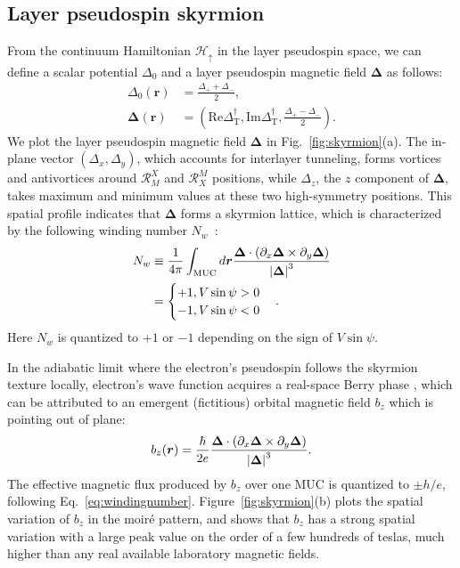 \documentclass[aps,prx,floatfix,twocolumn]{revtex4-1}
\begin{document}
	\subsection{Layer pseudospin skyrmion}
	From the continuum Hamiltonian $\mathcal{H}_{\uparrow}$ in the layer pseudospin space, we can define a scalar potential $\Delta_0$ and a layer pseudospin magnetic field $\bm{\Delta}$ as follows:
	\begin{equation} \label{key}
	\begin{aligned}
	\Delta_0(\bm{r})&=\frac{\Delta_+ + \Delta_-}{2},\\
	\bm{\Delta}(\bm{r})&=\left(\text{Re}\Delta_{\text{T}}^\dagger,\text{Im}\Delta_{\text{T}}^\dagger, \frac{\Delta_+ - \Delta_-}{2} \right).
	\end{aligned}
	\end{equation}
	We plot the layer pseudospin magnetic field $\bm{\Delta}$ in Fig.~\ref{fig:skyrmion}(a). The in-plane vector $(\Delta_x, \Delta_y)$,  which accounts for interlayer tunneling, forms vortices and antivortices  around $\mathcal{R}_{M}^X$ and $\mathcal{R}_{X}^M$ positions, while $\Delta_z$, the $z$ component of $\bm{\Delta}$, takes maximum and minimum values at these two high-symmetry positions.  This spatial profile indicates that $\bm{\Delta}$ forms a skyrmion lattice, which is characterized by the following winding number $N_w$~\cite{nagaosa2013topological}:
	\begin{equation}\label{eq:windingnumber}
	\begin{aligned}
	N_w &\equiv\frac{1}{4\pi}\int_{\text{MUC}}d\bm{r}\frac{\bm{\Delta}\cdot(\partial_x \bm{\Delta} \times \partial_y \bm{\Delta})}{\abs{\bm{\Delta}}^3}\\
	&=\begin{cases}
	+1, V\sin\psi>0\\
	-1, V\sin\psi<0
	\end{cases}.
	\end{aligned}
	\end{equation}
	Here $N_w$ is quantized to $+1$ or $-1$ depending on the sign of $V \sin \psi$. 
	
	In the adiabatic limit where the electron's pseudospin  follows the skyrmion texture locally, electron's wave function acquires a real-space Berry phase \cite{nagaosa2013topological}, which can be attributed to an emergent (fictitious) orbital magnetic field $b_z$ which is pointing out of plane:  
	\begin{equation}\label{eq:bz}
	b_z(\bm{r})=\frac{\hbar}{2e}\frac{\bm{\Delta}\cdot(\partial_x \bm{\Delta} \times \partial_y \bm{\Delta})}{\abs{\bm{\Delta}}^3}.
	\end{equation}
	The effective magnetic flux produced by $b_z$ over one MUC is quantized to $\pm h/e$, following Eq.~\eqref{eq:windingnumber}.
	Figure~\ref{fig:skyrmion}(b) plots the spatial variation of $b_z$ in the moir\'e pattern, and shows that $b_z$ has a strong spatial variation with a large peak value on the order of a few hundreds of teslas, much higher than any real available laboratory magnetic fields.
	
\end{document}

